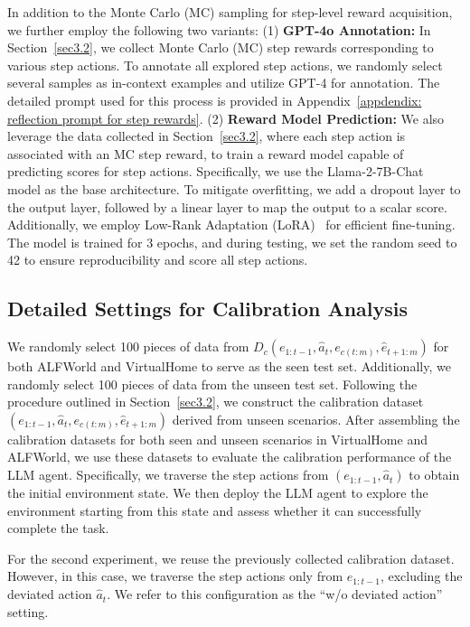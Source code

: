 In addition to the Monte Carlo (MC) sampling for step-level reward acquisition, we further employ the following two variants: 
(1) \textbf{GPT-4o Annotation:} In Section~\ref{sec3.2}, we collect Monte Carlo (MC) step rewards corresponding to various step actions. To annotate all explored step actions, we randomly select several samples as in-context examples and utilize GPT-4 for annotation. The detailed prompt used for this process is provided in Appendix~\ref{appdendix: reflection prompt for step rewards}.
(2) \textbf{Reward Model Prediction:} We also leverage the data collected in Section~\ref{sec3.2}, where each step action is associated with an MC step reward, to train a reward model capable of predicting scores for step actions. Specifically, we use the Llama-2-7B-Chat~\citep{touvron2023llama} model as the base architecture. To mitigate overfitting, we add a dropout layer to the output layer, followed by a linear layer to map the output to a scalar score. Additionally, we employ Low-Rank Adaptation (LoRA)~\citep{hu2021lora} for efficient fine-tuning. The model is trained for 3 epochs, and during testing, we set the random seed to 42 to ensure reproducibility and score all step actions.


\subsection{Detailed Settings for Calibration Analysis}
\label{appendix:calibration_analysis}

We randomly select 100 pieces of data from $D_c(e_{1:t-1}, \hat{a}_t, e_{c(t:m)}, \hat{e}_{t+1:m})$ for both ALFWorld and VirtualHome to serve as the seen test set. Additionally, we randomly select 100 pieces of data from the unseen test set. Following the procedure outlined in Section~\ref{sec3.2}, we construct the calibration dataset $(e_{1:t-1}, \hat{a}_t, e_{c(t:m)}, \hat{e}_{t+1:m})$ derived from unseen scenarios.
After assembling the calibration datasets for both seen and unseen scenarios in VirtualHome and ALFWorld, we use these datasets to evaluate the calibration performance of the LLM agent. Specifically, we traverse the step actions from $(e_{1:t-1}, \hat{a}_t)$ to obtain the initial environment state. We then deploy the LLM agent to explore the environment starting from this state and assess whether it can successfully complete the task.

For the second experiment, we reuse the previously collected calibration dataset. However, in this case, we traverse the step actions only from $e_{1:t-1}$, excluding the deviated action $\hat{a}_t$. We refer to this configuration as the ``w/o deviated action'' setting.




